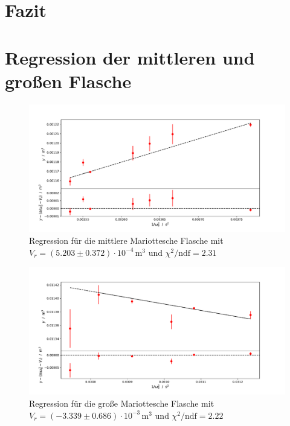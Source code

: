 \documentclass[a4paper, 12pt]{scrartcl}
\begin{document}
\section{Fazit}

\appendix
\section{Regression der mittleren und großen Flasche}\label{app:reg}
\begin{figure}[H]
\centering
\includegraphics[width=\textwidth]{plots/regression_mittel.pdf}
\caption{Regression für die mittlere Mariottesche Flasche mit $V_r = (5.203 \pm 0.372)\cdot 10^{-4}\,\text{m}^3$ und $\chi^2/\text{ndf} = 2.31$}
\end{figure}
\begin{figure}[H]
\centering
\includegraphics[width=\textwidth]{plots/regression_grosse.pdf}
\caption{Regression für die große Mariottesche Flasche mit $V_r = (-3.339 \pm 0.686)\cdot 10^{-3}\,\text{m}^3$ und $\chi^2/\text{ndf} = 2.22$}
\end{figure}
\end{document}
